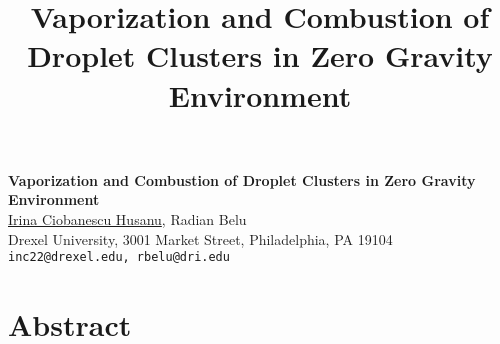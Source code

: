 \title{Vaporization and Combustion of Droplet Clusters in Zero Gravity Environment}
\author{} \institute{}

\begin{center}

\textbf{\Large Vaporization and Combustion of Droplet Clusters in Zero Gravity Environment}\\
\vspace{10mm}
{\large \underline{Irina Ciobanescu Husanu}, Radian Belu}\\
Drexel University, 3001 Market Street, Philadelphia, PA 19104\\
{\tt inc22@drexel.edu, rbelu@dri.edu}

\end{center}

\section*{Abstract}


